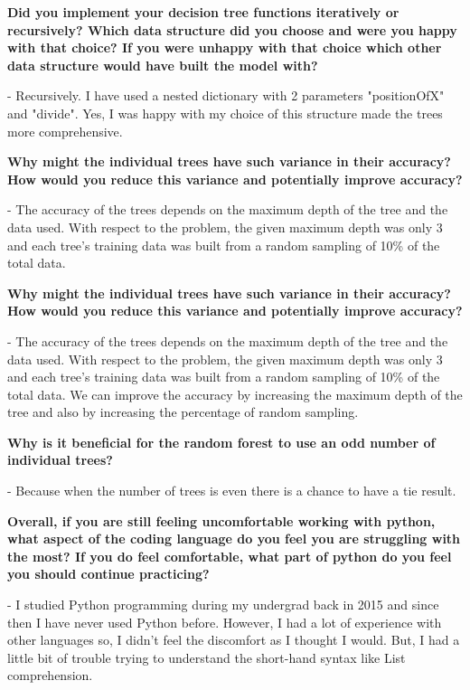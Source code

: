 \documentclass{exam}
\begin{document}
\vspace{5mm}

\vspace{5mm}
\begin{questions}

\question\textbf{ Did you implement your decision tree functions iteratively or recursively? Which data structure did you choose and were you happy with that choice? If you were unhappy with that choice which other data structure would have built the model with?}
\par\normalfont 
- Recursively. I have used a nested dictionary with 2 parameters "positionOfX" and "divide". Yes, I was happy with my choice of this structure made the trees more comprehensive.

\question\textbf{Why might the individual trees have such variance in their accuracy? How would you reduce this variance and potentially improve accuracy?}
\par\normalfont 
- The accuracy of the trees depends on the maximum depth of the tree and the data used. With respect to the problem, the given maximum depth was only 3 and each tree’s training data was built from a random sampling of 10\% of the total data.

\question\textbf{Why might the individual trees have such variance in their accuracy? How would you reduce this variance and potentially improve accuracy?}
\par\normalfont 
- The accuracy of the trees depends on the maximum depth of the tree and the data used. With respect to the problem, the given maximum depth was only 3 and each tree’s training data was built from a random sampling of 10\% of the total data.
\hfill \break We can improve the accuracy by increasing the maximum depth of the tree and also by increasing the percentage of random sampling.  

\question\textbf{Why is it beneficial for the random forest to use an odd number of individual trees?}
\par\normalfont 
- Because when the number of trees is even there is a chance to have a tie result. 

\question\textbf{Overall, if you are still feeling uncomfortable working with python, what aspect of the coding language do you feel you are struggling with the most? If you do feel comfortable, what part of python do you feel you should continue practicing?}
\par\normalfont 
- I studied Python programming during my undergrad back in 2015 and since then I have never used Python before. However, I had a lot of experience with other languages so, I didn't feel the discomfort as I thought I would. But, I had a little bit of trouble trying to understand the short-hand syntax like List comprehension. 

\end{questions}
\clearpage
\end{document}
